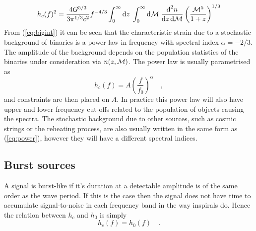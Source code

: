 \begin{equation}\label{eq:bigint}
h_{c}(f)^{2}=\frac{4G^{5/3}}{3\pi^{1/3}c^{2}}f^{-4/3}\int_{0}^{\infty}\textrm{d}z\;\int_{0}^{\infty}\textrm{d}{\cal{M}}\;\frac{\textrm{d}^{2}n}{\textrm{d}z\,\textrm{d}{\cal{M}}}\left( \frac{{\cal{M}}^{5}}{1+z} \right)^{1/3}
\end{equation}
From (\ref{eq:bigint}) it can be seen that the characteristic strain due to a stochastic background of binaries is a power law in frequency with spectral index $\alpha=-2/3$. The amplitude of the background depends on the population statistics of the binaries under consideration via $n(z,{\cal{M}})$. The power law is usually parametrised as
\begin{equation}\label{eq:power} h_{c}(f)= A\left(\frac{f}{f_{0}}\right)^{\alpha} \quad , \end{equation}
and constraints are then placed on $A$. In practice this power law will also have upper and lower frequency cut-offs related to the population of objects causing the spectra. The stochastic background due to other sources, such as cosmic strings or the reheating process, are also usually written in the same form as (\ref{eq:power}), however they will have a different spectral indices.




\subsection{Burst sources}
A signal is burst-like if it's duration at a detectable amplitude is of the same order as the wave period. If this is the case then the signal does not have time to accumulate signal-to-noise in each frequency band in the way inspirals do. Hence the relation between $h_{c}$ and $h_{0}$ is simply
\begin{equation}\label{eq:simple} h_{c}(f)=h_{0}(f) \quad . \end{equation}

